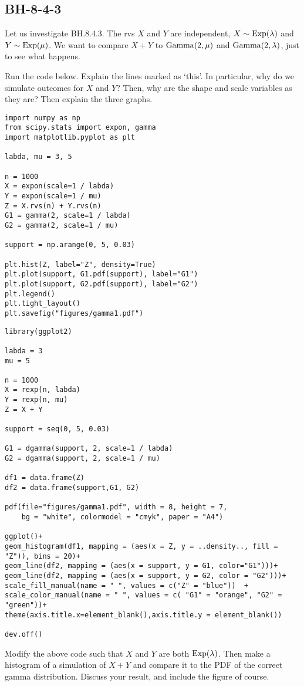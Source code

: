 \subsection{BH-8-4-3}
\label{sec:sum-two-gamma}

Let us investigate BH.8.4.3. The rvs $X$ and $Y$ are independent, $X\sim\mathrm{Exp}(\lambda)$ and $Y\sim\mathrm{Exp}(\mu)$. We want to compare $X+Y$ to $\mathrm{Gamma}(2, \mu)$ and $\mathrm{Gamma}(2, \lambda)$, just to see what happens.

\begin{exercise}
Run the  code below. Explain the lines marked as `this'. In particular, why do we simulate outcomes for $X$ and $Y$? Then, why are the shape and scale variables as they are? Then explain the three graphs.
\begin{verbatim}
import numpy as np
from scipy.stats import expon, gamma
import matplotlib.pyplot as plt

labda, mu = 3, 5

n = 1000
X = expon(scale=1 / labda)
Y = expon(scale=1 / mu)
Z = X.rvs(n) + Y.rvs(n)
G1 = gamma(2, scale=1 / labda)
G2 = gamma(2, scale=1 / mu)

support = np.arange(0, 5, 0.03)

plt.hist(Z, label="Z", density=True)
plt.plot(support, G1.pdf(support), label="G1")
plt.plot(support, G2.pdf(support), label="G2")
plt.legend()
plt.tight_layout()
plt.savefig("figures/gamma1.pdf")
\end{verbatim}

\begin{verbatim}
library(ggplot2)

labda = 3
mu = 5

n = 1000
X = rexp(n, labda)
Y = rexp(n, mu)
Z = X + Y

support = seq(0, 5, 0.03)

G1 = dgamma(support, 2, scale=1 / labda)
G2 = dgamma(support, 2, scale=1 / mu)

df1 = data.frame(Z)
df2 = data.frame(support,G1, G2)

pdf(file="figures/gamma1.pdf", width = 8, height = 7,
    bg = "white", colormodel = "cmyk", paper = "A4")

ggplot()+
geom_histogram(df1, mapping = (aes(x = Z, y = ..density.., fill = "Z")), bins = 20)+
geom_line(df2, mapping = (aes(x = support, y = G1, color="G1")))+
geom_line(df2, mapping = (aes(x = support, y = G2, color = "G2")))+
scale_fill_manual(name = " ", values = c("Z" = "blue"))  +
scale_color_manual(name = " ", values = c( "G1" = "orange", "G2" = "green"))+
theme(axis.title.x=element_blank(),axis.title.y = element_blank())

dev.off()
\end{verbatim}
\end{exercise}

\begin{exercise}
Modify the above code such that $X$ and $Y$ are both $\mathrm{Exp}(\lambda)$. Then make a histogram of a simulation of $X+Y$ and compare it to the PDF of the correct gamma  distribution. Discuss your result, and include the figure of course.
\end{exercise}
